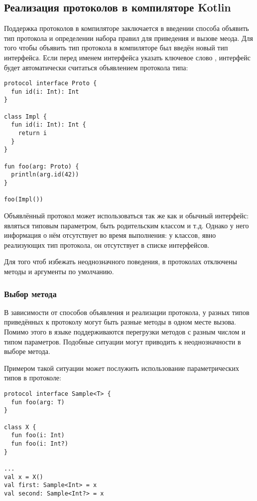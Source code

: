 \subsection{Реализация протоколов в компиляторе Kotlin}

Поддержка протоколов в компиляторе заключается в введении способа объявить тип протокола и определении набора правил для приведения и вызове меода. Для того чтобы объявить тип протокола в компиляторе был введён новый тип интерфейса. Если перед именем интерфейса указать ключевое слово , интерфейс будет автоматически считаться объявлением протокола типа:

\begin{verbatim}
protocol interface Proto {
  fun id(i: Int): Int
}

class Impl {
  fun id(i: Int): Int {
    return i
  }
}

fun foo(arg: Proto) {
  println(arg.id(42))
}

foo(Impl())
\end{verbatim}

Объявлённый протокол может использоваться так же как и обычный интерфейс: являться типовым параметром, быть родительским классом и т.д. Однако у него информация о нём отсутствует во время выполнения: у классов, явно реализующих тип протокола, он отсутствует в списке интерфейсов.

Для того чтоб избежать неоднозначного поведения, в протоколах отключены методы и аргументы по умолчанию.

\subsubsection{Выбор метода}

В зависимости от способов объявления и реализации протокола, у разных типов приведённых к протоколу могут быть разные методы в одном месте вызова. Помимо этого в языке  поддерживаются перегрузки методов с разным числом и типом параметров. Подобные ситуации могут приводить к неоднозначности в выборе метода.

Примером такой ситуации может послужить использование параметрических типов в протоколе:
\begin{verbatim}
protocol interface Sample<T> {
  fun foo(arg: T)
}

class X {
  fun foo(i: Int)
  fun foo(i: Int?)
}

...
val x = X()
val first: Sample<Int> = x
val second: Sample<Int?> = x

\end{verbatim}

